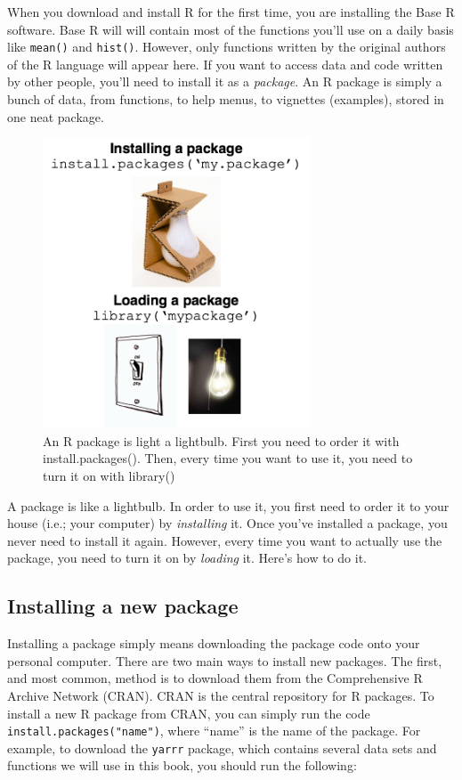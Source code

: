 \documentclass[]{book}
\theoremstyle{definition}
\theoremstyle{definition}
\theoremstyle{remark}
\begin{document}
When you download and install R for the first time, you are installing
the Base R software. Base R will will contain most of the functions
you'll use on a daily basis like \texttt{mean()} and \texttt{hist()}.
However, only functions written by the original authors of the R
language will appear here. If you want to access data and code written
by other people, you'll need to install it as a \emph{package}. An R
package is simply a bunch of data, from functions, to help menus, to
vignettes (examples), stored in one neat package.

\begin{figure}

{\centering \includegraphics[width=300px]{images/packagebulb} 

}

\caption{An R package is light a lightbulb. First you need to order it with install.packages(). Then, every time you want to use it, you need to turn it on with library()}\label{fig:package}
\end{figure}

A package is like a lightbulb. In order to use it, you first need to
order it to your house (i.e.; your computer) by \emph{installing} it.
Once you've installed a package, you never need to install it again.
However, every time you want to actually use the package, you need to
turn it on by \emph{loading} it. Here's how to do it.

\subsection{Installing a new package}\label{installing-a-new-package}

Installing a package simply means downloading the package code onto your
personal computer. There are two main ways to install new packages. The
first, and most common, method is to download them from the
Comprehensive R Archive Network (CRAN). CRAN is the central repository
for R packages. To install a new R package from CRAN, you can simply run
the code \texttt{install.packages("name")}, where ``name'' is the name
of the package. For example, to download the \texttt{yarrr} package,
which contains several data sets and functions we will use in this book,
you should run the following:
\end{document}
